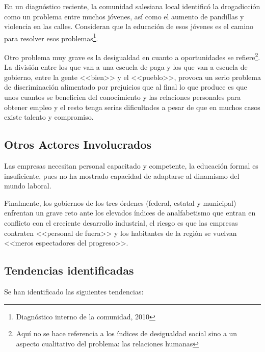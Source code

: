 En un diagnóstico reciente, la comunidad salesiana local identificó la drogadicción como un problema entre muchos jóvenes, así como el aumento de pandillas y violencia en las calles. Consideran que la educación de esos jóvenes es el camino para resolver esos problemas\footnote{Diagnóstico interno de la comunidad, 2010}.

Otro problema muy grave es la desigualdad en cuanto a oportunidades se refiere\footnote{Aquí no se hace referencia a los índices de desigualdad social sino a un aspecto cualitativo del problema: las relaciones humanas}. La división entre los que van a una escuela de paga y los que van a escuela de gobierno, entre la gente <<bien>> y el <<pueblo>>, provoca un serio problema de discriminación alimentado por prejuicios que al final lo que produce es que unos cuantos se beneficien del conocimiento y las relaciones personales para obtener empleo y el resto tenga serias dificultades a pesar de que en muchos casos existe talento y compromiso.

\subsection{Otros Actores Involucrados}

Las empresas necesitan personal capacitado y competente, la educación formal es insuficiente, pues no ha mostrado capacidad de adaptarse al dinamismo del mundo laboral.

Finalmente, los gobiernos de los tres órdenes (federal, estatal y municipal) enfrentan un grave reto ante los elevados índices de analfabetismo que entran en conflicto con el creciente desarrollo industrial, el riesgo es que las empresas contraten <<personal de fuera>> y los habitantes de la región se vuelvan <<meros espectadores del progreso>>.

\subsection{Tendencias identificadas}

Se han identificado las siguientes tendencias:

